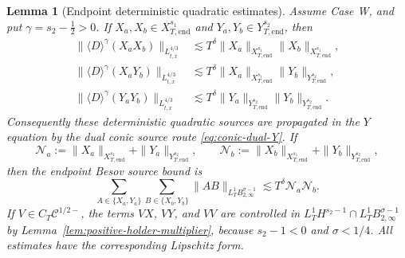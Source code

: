 \documentclass[10pt]{amsart}
\numberwithin{equation}{section}
\theoremstyle{plain}
\newtheorem{lemma}[theorem]{Lemma}
\theoremstyle{definition}
\theoremstyle{remark}
\begin{document}
\begin{lemma}[Endpoint deterministic quadratic estimates]\label{lem:endpoint-quadratic-estimates}
Assume Case W, and put $\gamma=s_2-\frac12>0$.  If $X_a,X_b\in X^{s_1}_{T,\mathrm{end}}$ and $Y_a,Y_b\in Y^{s_2}_{T,\mathrm{end}}$, then
\begin{align}
 \|\langle D\rangle^\gamma(X_aX_b)\|_{L_{t,x}^{4/3}}
 &\lesssim T^\delta
 \|X_a\|_{X^{s_1}_{T,\mathrm{end}}}\|X_b\|_{X^{s_1}_{T,\mathrm{end}}},
 \label{eq:endpoint-XX-dual}\\
 \|\langle D\rangle^\gamma(X_aY_b)\|_{L_{t,x}^{4/3}}
 &\lesssim T^\delta
 \|X_a\|_{X^{s_1}_{T,\mathrm{end}}}\|Y_b\|_{Y^{s_2}_{T,\mathrm{end}}},
 \label{eq:endpoint-XY-dual}\\
 \|\langle D\rangle^\gamma(Y_aY_b)\|_{L_{t,x}^{4/3}}
 &\lesssim T^\delta
 \|Y_a\|_{Y^{s_2}_{T,\mathrm{end}}}\|Y_b\|_{Y^{s_2}_{T,\mathrm{end}}}.
 \label{eq:endpoint-YY-dual}
\end{align}
Consequently these deterministic quadratic sources are propagated in the $Y$ equation by the dual conic source route \eqref{eq:conic-dual-Y}.  If
\[
        \mathcal N_a:=\|X_a\|_{X^{s_1}_{T,\mathrm{end}}}
        +\|Y_a\|_{Y^{s_2}_{T,\mathrm{end}}},
        \qquad
        \mathcal N_b:=\|X_b\|_{X^{s_1}_{T,\mathrm{end}}}
        +\|Y_b\|_{Y^{s_2}_{T,\mathrm{end}}},
\]
then the endpoint Besov source bound is
\begin{equation}\label{eq:endpoint-besov-source-from-l43}
 \sum_{A\in\{X_a,Y_a\}}\sum_{B\in\{X_b,Y_b\}}
 \|AB\|_{L_T^1B_{2,\infty}^{\sigma-1}}
 \lesssim T^\delta\mathcal N_a\mathcal N_b.
\end{equation}
If $V\in C_T\mathcal C^{1/2-}$, the terms $VX$, $VY$, and $VV$ are controlled in $L_T^1H^{s_2-1}\cap L_T^1B_{2,\infty}^{\sigma-1}$ by Lemma~\ref{lem:positive-holder-multiplier}, because $s_2-1<0$ and $\sigma<1/4$.  All estimates have the corresponding Lipschitz form.
\end{lemma}
\end{document}
